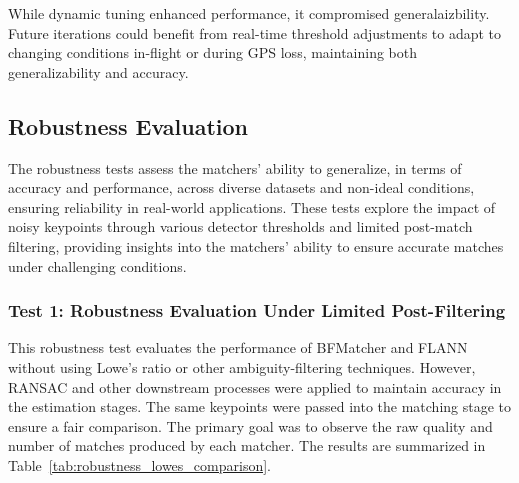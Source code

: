 While dynamic tuning enhanced performance, it compromised generalaizbility. Future iterations could benefit from real-time threshold adjustments to adapt to changing conditions in-flight or during GPS loss, maintaining both generalizability and accuracy.





\subsection{Robustness Evaluation}

The robustness tests assess the matchers' ability to generalize, in terms of accuracy and performance, across diverse datasets and non-ideal conditions, ensuring reliability in real-world applications. These tests explore the impact of noisy keypoints through various detector thresholds and limited post-match filtering, providing insights into the matchers' ability to ensure accurate matches under challenging conditions.

\subsubsection*{Test 1: Robustness Evaluation Under Limited Post-Filtering}

This robustness test evaluates the performance of BFMatcher and FLANN without using Lowe’s ratio or other ambiguity-filtering techniques. However, RANSAC and other downstream processes were applied to maintain accuracy in the estimation stages. The same keypoints were passed into the matching stage to ensure a fair comparison. The primary goal was to observe the raw quality and number of matches produced by each matcher. The results are summarized in Table~\ref{tab:robustness_lowes_comparison}.

